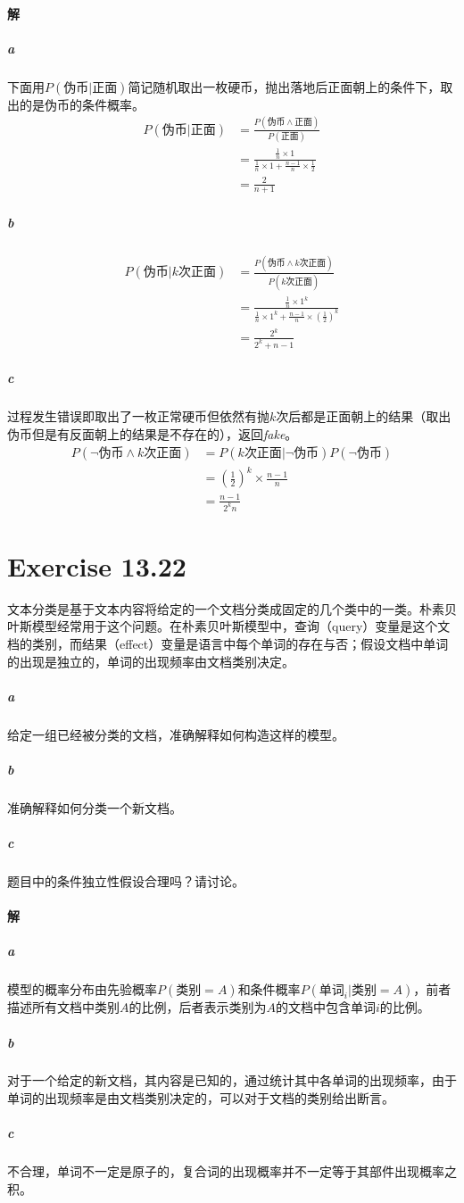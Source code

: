 \documentclass{article}
\begin{document}
\paragraph{解}
\subparagraph{a}
下面用$P(\text{伪币}|\text{正面})$简记随机取出一枚硬币，抛出落地后正面朝上的条件下，取出的是伪币的条件概率。
\begin{align*}
    P(\text{伪币}|\text{正面}) & = \frac{P(\text{伪币} \land \text{正面})}{P(\text{正面})}                                \\
                               & = \frac{\frac{1}{n} \times 1}{\frac{1}{n} \times 1 + \frac{n - 1}{n} \times \frac{1}{2}} \\
                               & = \frac{2}{n + 1}
\end{align*}
\subparagraph{b}
\begin{align*}
    P(\text{伪币}|\text{$k$次正面}) & = \frac{P(\text{伪币} \land \text{$k$次正面})}{P(\text{$k$次正面})}                              \\
                                    & = \frac{\frac{1}{n} \times 1^k}{\frac{1}{n} \times 1^k + \frac{n - 1}{n} \times (\frac{1}{2})^k} \\
                                    & = \frac{2^k}{2^k + n - 1}
\end{align*}
\subparagraph{c}
过程发生错误即取出了一枚正常硬币但依然有抛$k$次后都是正面朝上的结果（取出伪币但是有反面朝上的结果是不存在的），返回\textit{fake}。
\begin{align*}
    P(\lnot \text{伪币} \land \text{$k$次正面}) & = P(\text{$k$次正面} | \lnot \text{伪币})P(\lnot \text{伪币}) \\
                                                & = \left(\frac{1}{2}\right)^k \times \frac{n - 1}{n}           \\
                                                & = \frac{n - 1}{2^kn}
\end{align*}

\section{Exercise 13.22}
文本分类是基于文本内容将给定的一个文档分类成固定的几个类中的一类。朴素贝叶斯模型经常用于这个问题。在朴素贝叶斯模型中，查询（query）变量是这个文档的类别，而结果（effect）变量是语言中每个单词的存在与否；假设文档中单词的出现是独立的，单词的出现频率由文档类别决定。
\subparagraph{a} 给定一组已经被分类的文档，准确解释如何构造这样的模型。
\subparagraph{b} 准确解释如何分类一个新文档。
\subparagraph{c} 题目中的条件独立性假设合理吗？请讨论。

\paragraph{解}
\subparagraph{a}
模型的概率分布由先验概率$P(\text{类别} = A)$和条件概率$P(\text{单词}_i|\text{类别} = A)$，前者描述所有文档中类别$A$的比例，后者表示类别为$A$的文档中包含单词$i$的比例。

\subparagraph{b}
对于一个给定的新文档，其内容是已知的，通过统计其中各单词的出现频率，由于单词的出现频率是由文档类别决定的，可以对于文档的类别给出断言。

\subparagraph{c}
不合理，单词不一定是原子的，复合词的出现概率并不一定等于其部件出现概率之积。
\end{document}

